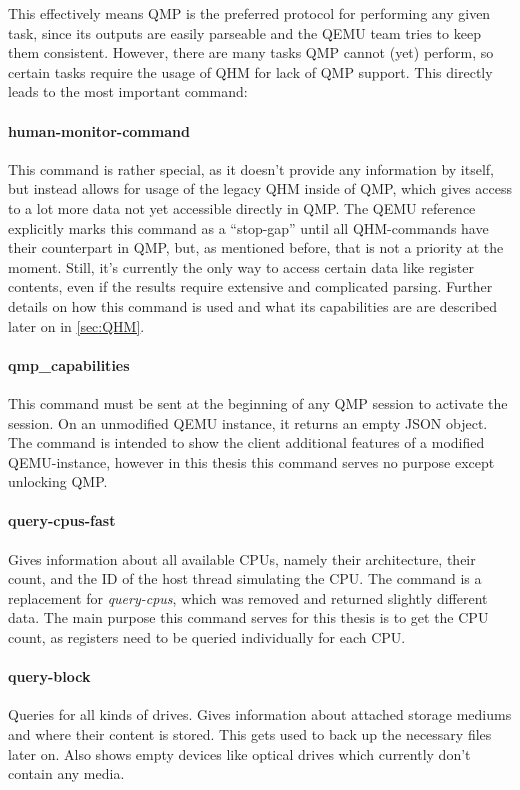 This effectively means QMP is the preferred protocol for performing any given task,
since its outputs are easily parseable and the QEMU team tries to keep them consistent.
However, there are many tasks QMP cannot (yet) perform,
so certain tasks require the usage of QHM for lack of QMP support.
This directly leads to the most important command\cite{qmp-commands}:

\paragraph{human-monitor-command}
This command is rather special, as it doesn't provide any information by itself,
but instead allows for usage of the legacy QHM inside of QMP,
which gives access to a lot more data not yet accessible directly in QMP.
The QEMU reference explicitly marks this command as a \enquote{stop-gap} until all QHM-commands have their counterpart in QMP,
but, as mentioned before, that is not a priority at the moment.
Still, it's currently the only way to access certain data like register contents, even if the results require extensive and complicated parsing.
Further details on how this command is used and what its capabilities are are described later on in \autoref{sec:QHM}.

\paragraph{qmp\_capabilities}
This command must be sent at the beginning of any QMP session to activate the session.
On an unmodified QEMU instance, it returns an empty JSON object.
The command is intended to show the client additional features of a modified QEMU-instance,
however in this thesis this command serves no purpose except unlocking QMP.

\paragraph{query-cpus-fast}
Gives information about all available CPUs, namely their architecture,
their count, and the ID of the host thread simulating the CPU.
The command is a replacement for \emph{query-cpus}, which was removed and returned slightly different data.
The main purpose this command serves for this thesis is to get the CPU count,
as registers need to be queried individually for each CPU.

\paragraph{query-block}
Queries for all kinds of drives. Gives information about attached storage mediums and where their content is stored.
This gets used to back up the necessary files later on.
Also shows empty devices like optical drives which currently don't contain any media.

